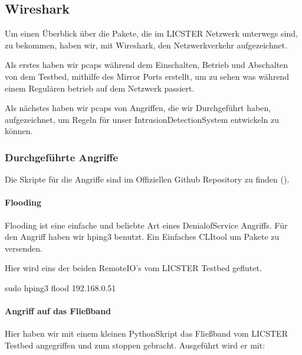 \documentclass[letterpaper,10pt,ngerman]{sphinxmanual}
\begin{document}
\subsection{Wireshark}
\label{\detokenize{ids:wireshark}}
Um einen Überblick über die Pakete, die im LICSTER Netzwerk unterwegs sind, zu
bekommen, haben wir, mit Wireshark, den Netzwerkverkehr aufgezeichnet.

Als erstes haben wir pcaps während dem Einschalten, Betrieb und Abschalten von dem Testbed, mithilfe des Mirror Ports erstellt,
um zu sehen was während einem Regulären betrieb auf dem Netzwerk passiert.

\noindent{}

Als nächstes haben wir pcaps von Angriffen, die wir Durchgeführt haben, aufgezeichnet, um Regeln für unser Intrusion\sphinxhyphen{}Detection\sphinxhyphen{}System entwickeln zu können.

\noindent{}


\subsubsection{Durchgeführte Angriffe}
\label{\detokenize{ids:durchgefuhrte-angriffe}}
Die Skripte für die Angriffe sind im Offiziellen Github Repository zu finden ().


\paragraph{Flooding}
\label{\detokenize{ids:flooding}}
Flooding ist eine einfache und beliebte Art eines Denial\sphinxhyphen{}of\sphinxhyphen{}Service Angriffs.
Für den Angriff haben wir hping3 benutzt. Ein Einfaches CLI\sphinxhyphen{}tool um Pakete zu versenden.

Hier wird eins der beiden RemoteIO’s vom LICSTER Testbed geflutet.

\begin{sphinxVerbatim}[commandchars=\\\{\}]
\PYGZdl{} sudo hping3 \PYGZhy{}\PYGZhy{}flood 192.168.0.51
\end{sphinxVerbatim}


\paragraph{Angriff auf das Fließband}
\label{\detokenize{ids:angriff-auf-das-flieszband}}
Hier haben wir mit einem kleinen Python\sphinxhyphen{}Skript das Fließband vom LICSTER Testbed angegriffen und zum stoppen gebracht.
Ausgeführt wird er mit:
\end{document}
